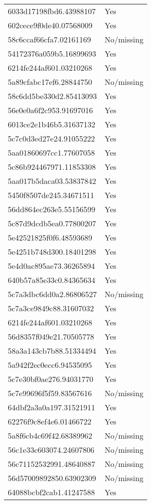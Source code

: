 \begin{tabular}{ll}
6033d17198fbd6.43988107 & Yes \\
602cece9f0de40.07568009 & Yes \\
58c6ccaf66cfa7.02161169 & No/missing \\
54172376a059b5.16899693 & Yes \\
6214fe244af601.03210268 & Yes \\
5a89cfabc17ef6.28844750 & No/missing \\
58c6dd5be330d2.85413093 & Yes \\
56e0e0a6f2c953.91697016 & Yes \\
6013ce2e1b46b5.31637132 & Yes \\
5c7c0d3ed27e24.91055222 & Yes \\
5aa01860697cc1.77607058 & Yes \\
5c86b924467971.11853308 & Yes \\
5aa017b5daca03.53837842 & Yes \\
5450f8507de245.34671511 & Yes \\
56dd864ec263e5.55156599 & Yes \\
5c87d9dcdb5ea0.77800207 & Yes \\
5e42521825f0f6.48593689 & Yes \\
5e4251b748d300.18401298 & Yes \\
5e4d0ac895ae73.36265894 & Yes \\
640b57a85e33c0.84365634 & Yes \\
5c7a3dbc6dd0a2.86806527 & No/missing \\
5c7a3ce9849c88.31607032 & Yes \\
6214fe244af601.03210268 & Yes \\
56d8357f049e21.70505778 & Yes \\
58a3a143cb7b88.51334494 & Yes \\
5a942f2ec0ecc6.94535095 & Yes \\
5c7e30bf0ae276.94031770 & Yes \\
5c7e99696f5f59.83567616 & No/missing \\
64dbf2a3a0a197.31521911 & Yes \\
62276f9c8ef4e6.01466722 & Yes \\
5a8f6cb4c69f42.68389962 & No/missing \\
56c1e33c603074.24607806 & No/missing \\
56c71152532991.48640887 & No/missing \\
56d57009892850.63902309 & No/missing \\
64088bcbf2cab1.41247588 & Yes \\

\end{tabular}
